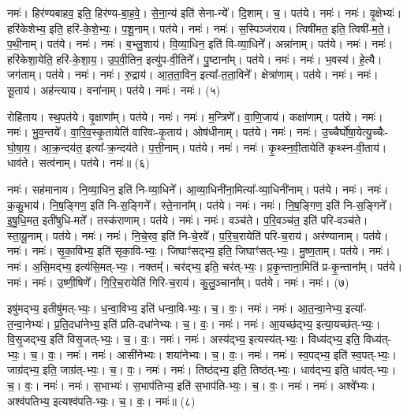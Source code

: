नमः॑। हिर॑ण्यबाहव॒ इति॒ हिर॑ण्य-बा॒ह॒वे॒। से॒ना॒न्य॑ इति॑ सेना-न्ये᳚। दि॒शाम्। च॒। पत॑ये। नमः॑। 
नमः॑। वृ॒क्षेभ्यः॑। हरि॑केशेभ्य॒ इति॒ हरि॑-के॒शे॒भ्यः॒। प॒शू॒नाम्। पत॑ये। नमः॑। 
नमः॑। स॒स्पिञ्ज॑राय। त्विषी॑मत॒ इति॒ त्विषी॑-म॒ते॒। प॒थी॒नाम्। पत॑ये। नमः॑। 
नमः॑। ब॒भ्लु॒शाय॑। वि॒व्या॒धिन॒ इति॑ वि-व्या॒धिने᳚। अन्ना॑नाम्। पत॑ये। नमः॑। 
नमः॑। हरि॑केशा॒येति॒ हरि॑-के॒शा॒य॒। उ॒प॒वी॒तिन॒ इत्यु॑प-वी॒तिने᳚। पु॒ष्टाना᳚म्। पत॑ये। नमः॑। 
नमः॑। भ॒वस्य॑। हे॒त्यै। जग॑ताम्। पत॑ये। नमः॑। 
नमः॑। रु॒द्राय॑। आ॒त॒ता॒विन॒ इत्या᳚-त॒ता॒विने᳚। क्षेत्रा॑णाम्। पत॑ये। नमः॑। 
नमः॑। सू॒ताय॑। अह॑न्त्याय। वना॑नाम्। पत॑ये। नमः॑। 
नमः॑। (५)


रोहि॑ताय। स्थ॒पत॑ये। वृ॒क्षाणा᳚म्। पत॑ये। नमः॑। 
नमः॑। म॒न्त्रिणे᳚। वा॒णि॒जाय॑। कक्षा॑णाम्। पत॑ये। नमः॑। 
नमः॑। भु॒व॒न्तये᳚। वा॒रि॒व॒स्कृ॒तायेति॑ वारिवः-कृ॒ताय॑। ओष॑धीनाम्। पत॑ये। नमः॑। 
नमः॑। उ॒च्चैर्घो॑षा॒येत्यु॒च्चैः-घो॒षा॒य॒। आ॒क्र॒न्दय॑त॒ इत्या᳚-क्र॒न्दय॑ते। प॒त्ती॒नाम्। पत॑ये। नमः॑। 
नमः॑। कृ॒थ्स्न॒वी॒तायेति॑ कृथ्स्न-वी॒ताय॑। धाव॑ते। सत्व॑नाम्। पत॑ये। नमः॑॥ (६)


नमः॑। सह॑मानाय। नि॒व्या॒धिन॒ इति॑ नि-व्या॒धिने᳚। आ॒व्या॒धिनी॑ना॒मित्या᳚-व्या॒धिनी॑नाम्। पत॑ये। नमः॑। 
नमः॑। क॒कु॒भाय॑। नि॒ष॒ङ्गिण॒ इति॑ नि-स॒ङ्गिने᳚। स्ते॒नाना᳚म्। पत॑ये। नमः॑। 
नमः॑। नि॒ष॒ङ्गिण॒ इति॑ नि-स॒ङ्गिने᳚। इ॒षु॒धि॒मत॒ इती॑षुधि-मते᳚। तस्क॑राणाम्। पत॑ये। नमः॑। 
नमः॑। वञ्च॑ते। प॒रि॒वञ्च॑त॒ इति॑ परि-वञ्च॑ते। स्ता॒यू॒नाम्। पत॑ये। नमः॑। 
नमः॑। नि॒चे॒रव॒ इति॑ नि-चे॒रवे᳚। प॒रि॒च॒रायेति॑ परि-च॒राय॑। अर॑ण्यानाम्। पत॑ये। नमः॑। 
नमः॑। सृ॒का॒विभ्य॒ इति॑ सृका॒वि-भ्यः॒। जिघाꣳ॑सद्भ्य॒ इति॒ जिघाꣳ॑सत्-भ्यः॒। मु॒ष्ण॒ताम्। पत॑ये। नमः॑। 
नमः॑। अ॒सि॒मद्भ्य॒ इत्य॑सि॒मत्-भ्यः॒। नक्तम्᳚। चर॑द्भ्य॒ इति॒ चर॑त्-भ्यः॒। प्र॒कृ॒न्ताना॒मिति॑ प्र-कृ॒न्ताना᳚म्। पत॑ये। नमः॑। 
नमः॑। उ॒ष्णी॒षिणे᳚। गि॒रि॒च॒रायेति॑ गिरि-च॒राय॑। कु॒लु॒ञ्चाना᳚म्। पत॑ये। नमः॑। नमः॑। (७)


इषु॑मद्भ्य॒ इतीषु॑मत्-भ्यः॒। ध॒न्वा॒विभ्य॒ इति॑ धन्वा॒वि-भ्यः॒। च॒। वः॒। नमः॑। 
नमः॑। आ॒त॒न्वा॒नेभ्य॒ इत्या᳚-त॒न्वा॒नेभ्यः॑। प्र॒ति॒दधा॑नेभ्य॒ इति॑ प्रति-दधा॑नेभ्यः। च॒। वः॒। नमः॑। 
नमः॑। आ॒यच्छ॑द्भ्य॒ इत्या॒यच्छ॑त्-भ्यः॒। वि॒सृ॒जद्भ्य॒ इति॑ विसृ॒जत्-भ्यः॒। च॒। वः॒। नमः॑। 
नमः॑। अस्य॑द्भ्य॒ इत्यस्य॑त्-भ्यः॒। विध्य॑द्भ्य॒ इति॒ विध्य॑त्-भ्यः॒। च॒। वः॒। नमः॑। 
नमः॑। आसी॑नेभ्यः। शया॑नेभ्यः। च॒। वः॒। नमः॑। 
नमः॑। स्व॒पद्भ्य॒ इति॑ स्व॒पत्-भ्यः॒। जाग्र॑द्भ्य॒ इति॒ जाग्र॑त्-भ्यः॒। च॒। वः॒। नमः॑। 
नमः॑। तिष्ठ॑द्भ्य॒ इति॒ तिष्ठ॑त्-भ्यः॒। धाव॑द्भ्य॒ इति॒ धाव॑त्-भ्यः॒। च॒। वः॒। नमः॑। 
नमः॑। स॒भाभ्यः॑। स॒भाप॑तिभ्य॒ इति॑ स॒भाप॑ति-भ्यः॒। च॒। वः॒। नमः॑। 
नमः॑। अश्वे᳚भ्यः। अश्व॑पतिभ्य॒ इत्यश्व॑पति-भ्यः॒। च॒। वः॒। नमः॑॥ (८)


